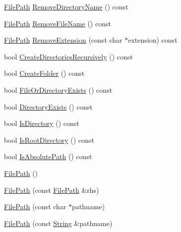 \begin{DoxyCompactItemize}
\item 
\hyperlink{classtesting_1_1internal_1_1FilePath}{\-File\-Path} \hyperlink{classtesting_1_1internal_1_1FilePath_afd5923a9e5f0d145f5c8fb80632c3683}{\-Remove\-Directory\-Name} () const 
\item 
\hyperlink{classtesting_1_1internal_1_1FilePath}{\-File\-Path} \hyperlink{classtesting_1_1internal_1_1FilePath_a9ad8a320421b2fe1c85e06903bf41d66}{\-Remove\-File\-Name} () const 
\item 
\hyperlink{classtesting_1_1internal_1_1FilePath}{\-File\-Path} \hyperlink{classtesting_1_1internal_1_1FilePath_ae9ec6c56e683314774276edffe880b7d}{\-Remove\-Extension} (const char $\ast$extension) const 
\item 
bool \hyperlink{classtesting_1_1internal_1_1FilePath_a49b3a8b7be27e6d2078698fb6345b5ce}{\-Create\-Directories\-Recursively} () const 
\item 
bool \hyperlink{classtesting_1_1internal_1_1FilePath_a988899e91e5f3b4a2e45bff194b91077}{\-Create\-Folder} () const 
\item 
bool \hyperlink{classtesting_1_1internal_1_1FilePath_a99532f523e54a6fd518ca846f0432908}{\-File\-Or\-Directory\-Exists} () const 
\item 
bool \hyperlink{classtesting_1_1internal_1_1FilePath_ae80e3c699144352575ec0eb29e604810}{\-Directory\-Exists} () const 
\item 
bool \hyperlink{classtesting_1_1internal_1_1FilePath_a6182eccf926d4fbba353514cf3d78b8a}{\-Is\-Directory} () const 
\item 
bool \hyperlink{classtesting_1_1internal_1_1FilePath_a9de4c1bffbbf501382c70dc0a73ed148}{\-Is\-Root\-Directory} () const 
\item 
bool \hyperlink{classtesting_1_1internal_1_1FilePath_a4dfd2cf07691a13cacc54a1fc975a609}{\-Is\-Absolute\-Path} () const 
\item 
\hyperlink{classtesting_1_1internal_1_1FilePath_aa5df70ab39fdaff6e3fce46e8d35b608}{\-File\-Path} ()
\item 
\hyperlink{classtesting_1_1internal_1_1FilePath_a7221ea73ecd74af3aca8c7e36910ca54}{\-File\-Path} (const \hyperlink{classtesting_1_1internal_1_1FilePath}{\-File\-Path} \&rhs)
\item 
\hyperlink{classtesting_1_1internal_1_1FilePath_a1aa42b124df2c0e7782e42e92d0d4b2f}{\-File\-Path} (const char $\ast$pathname)
\item 
\hyperlink{classtesting_1_1internal_1_1FilePath_aaeb318bdf958a4c69cd1597ba6078da6}{\-File\-Path} (const \hyperlink{classtesting_1_1internal_1_1String}{\-String} \&pathname)

\end{DoxyCompactItemize}
